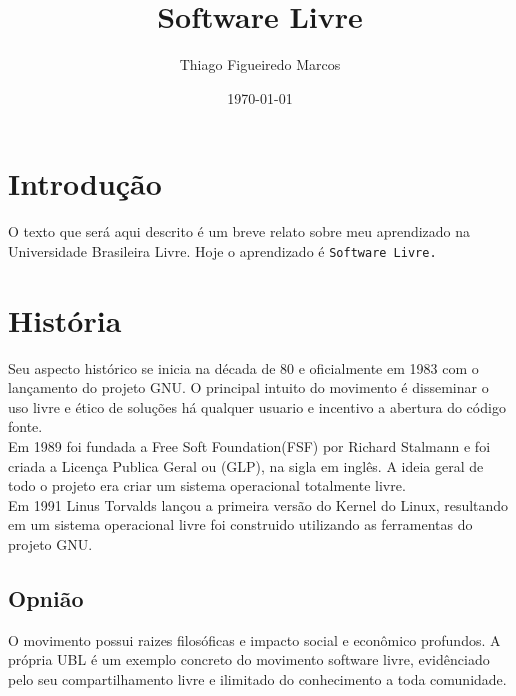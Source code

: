 \documentclass[12pt, onecolumn]{article}
\title{Software Livre}
\author{Thiago Figueiredo Marcos}
\date{\today}
\begin{document}
    \maketitle

    \tableofcontents

    \section*{Introdução}
        \hspace{2cm} O texto que será aqui descrito é um breve relato sobre meu aprendizado na Universidade Brasileira Livre.
            Hoje o aprendizado é {\tt Software Livre.}

    \section{História}
        \hspace{2cm}    Seu aspecto histórico se inicia na década de 80 e oficialmente em 1983 com o lançamento do projeto GNU.
            O principal intuito do movimento é disseminar o uso livre e ético de soluções 
            há qualquer usuario e incentivo a abertura do código fonte.\\ 

        \hspace{2cm}    Em 1989 foi fundada a Free Soft Foundation(FSF) por Richard Stalmann e foi criada a Licença Publica Geral ou (GLP),
            na sigla em inglês. A ideia geral de todo o projeto era criar um sistema operacional totalmente livre.\\

        \hspace{2cm}     Em 1991 Linus Torvalds lançou a primeira versão do Kernel do Linux, resultando em um sistema operacional livre
            foi construido utilizando as ferramentas do projeto GNU.

        \subsection{Opnião}
            \hspace{2cm}    O movimento possui raizes filosóficas e impacto social e econômico profundos. 
                A própria UBL é um exemplo concreto do movimento software livre, evidênciado pelo seu compartilhamento livre e ilimitado 
                do conhecimento a toda comunidade. \\ 
            
\end{document}
